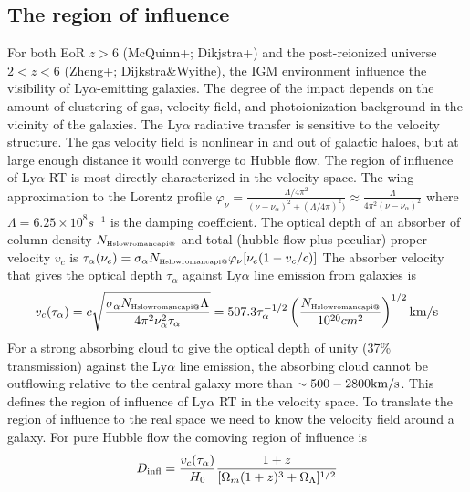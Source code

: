 \documentclass[useAMS,usenatbib,twocolumn]{mn2e}
\makeatletter
\newcommand{\Rmnum}[1]{\expandafter\@slowromancap\romannumeral #1@}
\newcommand{\LyA}{\mbox{Ly}\alpha}
\newcommand{\NHI}{N_{\mbox{\tiny H\Rmnum{1}}}}
\makeatother
\begin{document}
\subsection{The region of influence}
For both EoR $z>6$ (McQuinn+; Dikjstra+) and the post-reionized universe 
$2<z<6$ (Zheng+; Dijkstra\&Wyithe), the IGM environment influence the
visibility of $\LyA$-emitting galaxies. The degree of the impact depends
on the amount of clustering of gas, velocity field, and photoionization
background in the vicinity of the galaxies. The $\LyA$ radiative transfer
is sensitive to the velocity structure. The gas velocity field is nonlinear
in and out of galactic haloes, but at large enough distance it would 
converge to Hubble flow. The region of influence of $\LyA$ RT is most 
directly characterized in the velocity space. The wing approximation to
the Lorentz profile $\varphi_\nu=\frac{\Lambda/4\pi^2}{(\nu-\nu_\alpha)^2+(\Lambda/4\pi)^2)}
\approx\frac{\Lambda}{4\pi^2(\nu-\nu_\alpha)^2}$ where $\Lambda=6.25\times10^8s^{-1}$ is
the damping coefficient.  The optical depth of 
an absorber of column density $\NHI$ and total (hubble flow plus peculiar)
proper velocity $v_c$ is $\tau_\alpha(\nu_e)=\sigma_\alpha\NHI\varphi_\nu[\nu_e(1-v_c/c)]$
The absorber velocity that gives the optical depth $\tau_\alpha$
against $\LyA$ line emission from galaxies is 
\begin{equation}
v_c(\tau_\alpha)=c\sqrt{\frac{\sigma_\alpha\NHI\Lambda}{4\pi^2\nu_\alpha^2\tau_\alpha}}
=507.3\tau_\alpha^{-1/2}\left(\frac{\NHI}{10^{20}cm^2}\right)^{1/2}\rm{km/s}
\end{equation}
For a strong absorbing cloud to give the optical depth of unity (37\% transmission) 
against the $\LyA$ line emission, the absorbing cloud cannot be 
outflowing relative to the central galaxy more than $\sim500-2800\rm{km/s}$.
This defines the region of influence of $\LyA$ RT in the velocity space.
To translate the region of influence to the real space we need to know the
velocity field around a galaxy. For pure Hubble flow the comoving region of influence
is 
\begin{equation}
D_{\rm{infl}}=\frac{v_c(\tau_\alpha)}{H_0}\frac{1+z}{[\Omega_m(1+z)^3+\Omega_\Lambda]^{1/2}}
\end{equation}
\end{document}
